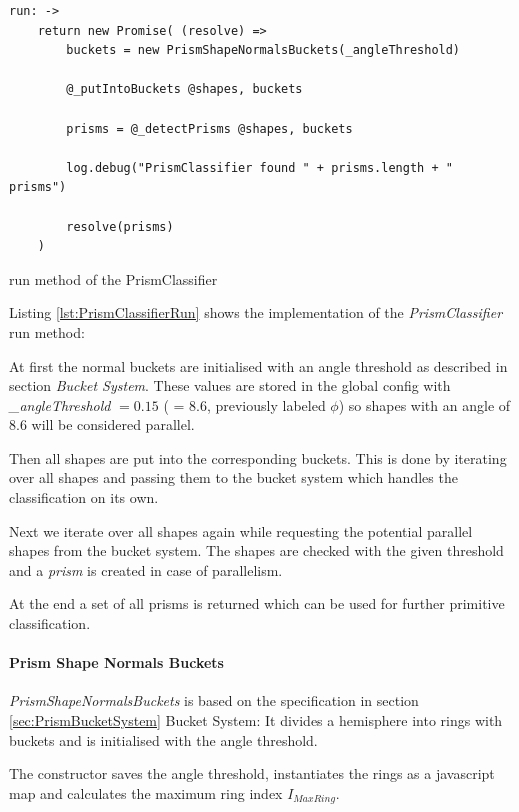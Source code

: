 \documentclass[../ClassicThesis.tex]{subfiles}
\begin{document}
\begin{listing}[!h]
\centering
\begin{verbatim}
run: ->
    return new Promise( (resolve) =>
        buckets = new PrismShapeNormalsBuckets(_angleThreshold)

        @_putIntoBuckets @shapes, buckets

        prisms = @_detectPrisms @shapes, buckets

        log.debug("PrismClassifier found " + prisms.length + " prisms")

        resolve(prisms)
    )
\end{verbatim}
\caption{run method of the PrismClassifier}
\label{lst:PrismClassifierRun}
\end{listing}

Listing \ref{lst:PrismClassifierRun} shows the implementation of the \emph{PrismClassifier} run method:

At first the normal buckets are initialised with an angle threshold as described in section \emph{Bucket System}. These values are stored in the global config with \emph{\_angleThreshold} $ = 0.15 $  ( = 8.6\textdegree, previously labeled $\phi$) so shapes with an angle  of 8.6\textdegree \hspace{1pt} will be considered parallel.

Then all shapes are put into the corresponding buckets. This is done by iterating over all shapes and passing them to the bucket system which handles the classification on its own.

Next we iterate over all shapes again while requesting the potential parallel shapes from the bucket system. The shapes are checked with the given threshold and a \emph{prism} is created in case of parallelism.

At the end a set of all prisms is returned which can be used for further primitive classification.


\paragraph{Prism Shape Normals Buckets}

\emph{PrismShapeNormalsBuckets} is based on the specification in section \ref{sec:PrismBucketSystem} Bucket System: It divides a hemisphere into rings with buckets and is initialised with the angle threshold.

The constructor saves the angle threshold, instantiates the rings as a javascript map and calculates the maximum ring index $I_{MaxRing}$.
\end{document}
